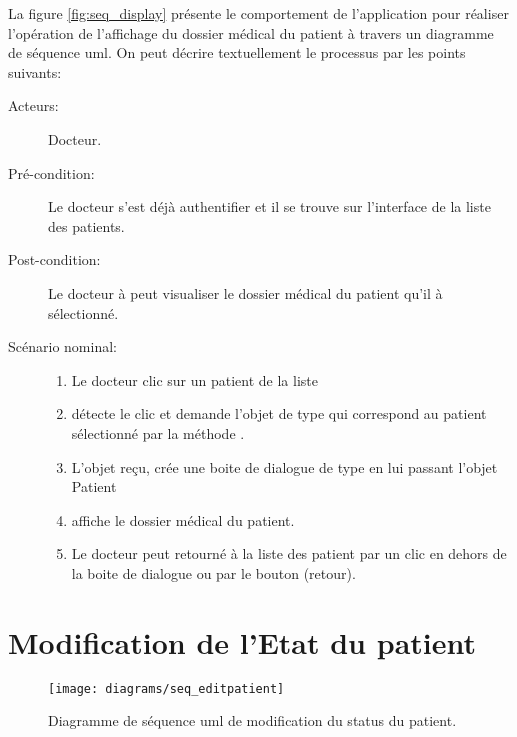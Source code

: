 La figure \ref{fig:seq_display} présente le comportement de l'application pour réaliser l'opération de l'affichage du dossier médical du patient à travers un diagramme de séquence \gls{uml}. On peut décrire textuellement le processus par les points suivants:

\begin{description}

\item[Acteurs:] Docteur.

\item[Pré-condition:] Le docteur s'est déjà authentifier et il se trouve sur l'interface de la liste des patients.

\item[Post-condition:] Le docteur à peut visualiser le dossier médical du patient qu'il à sélectionné.

\item[Scénario nominal:]

\begin{enumerate}

\item Le docteur clic sur un patient de la liste

\item {} détecte le clic et demande l'objet de type  qui correspond au patient sélectionné par la méthode .

\item L'objet  reçu,  crée une boite de  dialogue de type  en lui passant l'objet Patient

\item {} affiche le dossier médical du patient.

\item Le docteur peut retourné à la liste des patient par un clic en dehors de la boite de dialogue ou par le bouton (retour).

\end{enumerate}

\end{description}

\section{Modification de l'Etat du patient}

\begin{figure}
\center
\texttt{[image: diagrams/seq\_editpatient]}
\caption{Diagramme de séquence \gls{uml} de modification du status du patient.}
\label{fig:seq_edit}
\end{figure}

